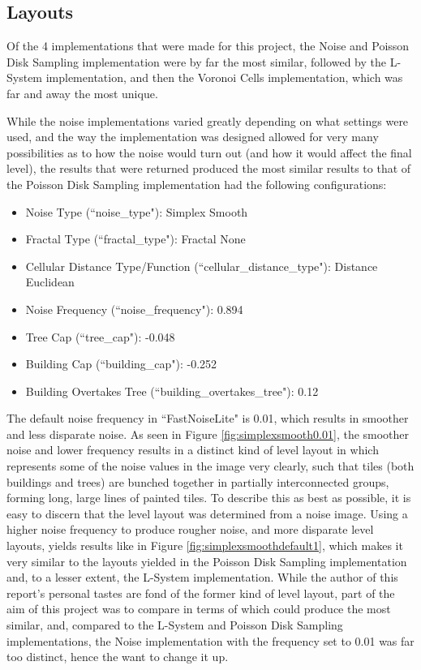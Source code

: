\subsection{Layouts}

Of the 4 implementations that were made for this project, the Noise and Poisson Disk Sampling implementation were by far the most similar, followed by the L-System implementation, and then the Voronoi Cells implementation, which was far and away the most unique.

While the noise implementations varied greatly depending on what settings were used, and the way the implementation was designed allowed for very many possibilities as to how the noise would turn out (and how it would affect the final level), the results that were returned produced the most similar results to that of the Poisson Disk Sampling implementation had the following configurations:

\begin{itemize} \label{noisedefaults}
    \item Noise Type (``noise\_type"): Simplex Smooth
    \item Fractal Type (``fractal\_type"): Fractal None
    \item Cellular Distance Type/Function (``cellular\_distance\_type"): Distance Euclidean
    \item Noise Frequency (``noise\_frequency"): 0.894
    \item Tree Cap (``tree\_cap"): -0.048
    \item Building Cap (``building\_cap"): -0.252
    \item Building Overtakes Tree (``building\_overtakes\_tree"): 0.12
\end{itemize}

The default noise frequency in ``FastNoiseLite" is 0.01, which results in smoother and less disparate noise. As seen in Figure \ref{fig:simplexsmooth0.01}, the smoother noise and lower frequency results in a distinct kind of level layout in which represents some of the noise values in the image very clearly, such that tiles (both buildings and trees) are bunched together in partially interconnected groups, forming long, large lines of painted tiles. To describe this as best as possible, it is easy to discern that the level layout was determined from a noise image. Using a higher noise frequency to produce rougher noise, and more disparate level layouts, yields results like in Figure \ref{fig:simplexsmoothdefault1}, which makes it very similar to the layouts yielded in the Poisson Disk Sampling implementation and, to a lesser extent, the L-System implementation. While the author of this report's personal tastes are fond of the former kind of level layout, part of the aim of this project was to compare in terms of which could produce the most similar, and, compared to the L-System and Poisson Disk Sampling implementations, the Noise implementation with the frequency set to 0.01 was far too distinct, hence the want to change it up.

